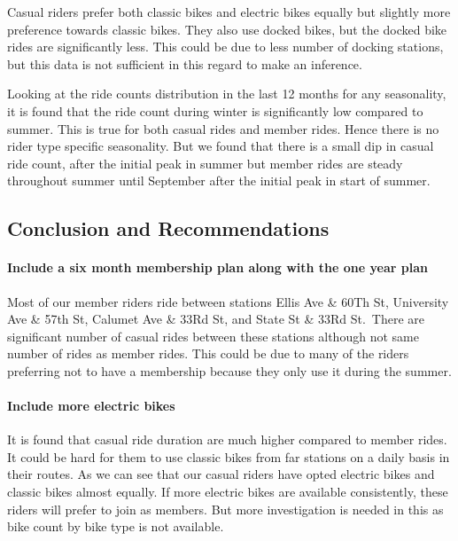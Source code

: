 \documentclass[
]{article}
\begin{document}
Casual riders prefer both classic bikes and electric bikes equally but
slightly more preference towards classic bikes. They also use docked
bikes, but the docked bike rides are significantly less. This could be
due to less number of docking stations, but this data is not sufficient
in this regard to make an inference.

Looking at the ride counts distribution in the last 12 months for any
seasonality, it is found that the ride count during winter is
significantly low compared to summer. This is true for both casual rides
and member rides. Hence there is no rider type specific seasonality. But
we found that there is a small dip in casual ride count, after the
initial peak in summer but member rides are steady throughout summer
until September after the initial peak in start of summer.

\hypertarget{conclusion-and-recommendations}{%
\subsection{Conclusion and
Recommendations}\label{conclusion-and-recommendations}}

\hypertarget{include-a-six-month-membership-plan-along-with-the-one-year-plan}{%
\paragraph{Include a six month membership plan along with the one year
plan}\label{include-a-six-month-membership-plan-along-with-the-one-year-plan}}

Most of our member riders ride between stations Ellis Ave \& 60Th St,
University Ave \& 57th St, Calumet Ave \& 33Rd St, and State St \& 33Rd
St.~There are significant number of casual rides between these stations
although not same number of rides as member rides. This could be due to
many of the riders preferring not to have a membership because they only
use it during the summer.

\hypertarget{include-more-electric-bikes}{%
\paragraph{Include more electric
bikes}\label{include-more-electric-bikes}}

It is found that casual ride duration are much higher compared to member
rides. It could be hard for them to use classic bikes from far stations
on a daily basis in their routes. As we can see that our casual riders
have opted electric bikes and classic bikes almost equally. If more
electric bikes are available consistently, these riders will prefer to
join as members. But more investigation is needed in this as bike count
by bike type is not available.
\end{document}
